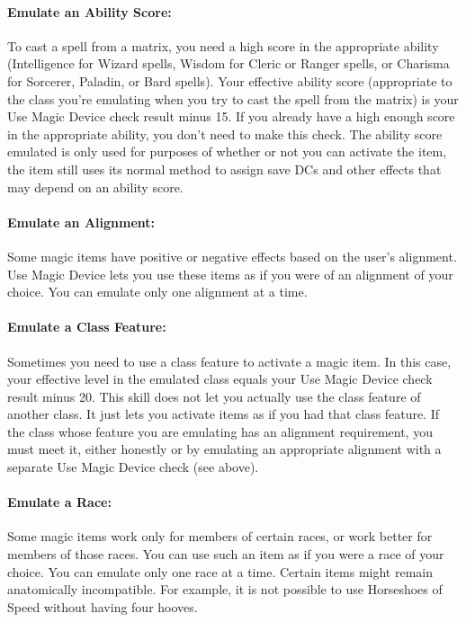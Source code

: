 \paragraph{Emulate an Ability Score:}
To cast a spell from a matrix, you need a high score in the appropriate ability (Intelligence for Wizard spells, Wisdom for Cleric or Ranger spells, or Charisma for Sorcerer, Paladin, or Bard spells). 
Your effective ability score (appropriate to the class you're emulating when you try to cast the spell from the matrix) is your Use Magic Device check result minus 15. If you already have a high enough score in the appropriate ability, you don't need to make this check.
The ability score emulated is only used for purposes of whether or not you can activate the item, the item still uses its normal method to assign save DCs and other effects that may depend on an ability score.

\paragraph{Emulate an Alignment:}
Some magic items have positive or negative effects based on the user's alignment. 
Use Magic Device lets you use these items as if you were of an alignment of your choice. 
You can emulate only one alignment at a time.

\paragraph{Emulate a Class Feature:}
Sometimes you need to use a class feature to activate a magic item. 
In this case, your effective level in the emulated class equals your Use Magic Device check result minus 20. 
This skill does not let you actually use the class feature of another class. 
It just lets you activate items as if you had that class feature. 
If the class whose feature you are emulating has an alignment requirement, you must meet it, either honestly or by emulating an appropriate alignment with a separate Use Magic Device check (see above).

\paragraph{Emulate a Race:}
Some magic items work only for members of certain races, or work better for members of those races. 
You can use such an item as if you were a race of your choice. 
You can emulate only one race at a time.
Certain items might remain anatomically incompatible. For example, it is not possible to use Horseshoes of Speed without having four hooves.

